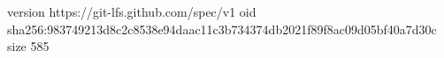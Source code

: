 version https://git-lfs.github.com/spec/v1
oid sha256:983749213d8c2c8538e94daac11c3b734374db2021f89f8ac09d05bf40a7d30c
size 585
